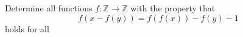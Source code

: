 Determine all functions $f:\mathbb{Z}\rightarrow\mathbb{Z}$ with the property that \[f(x-f(y))=f(f(x))-f(y)-1\]holds for all 